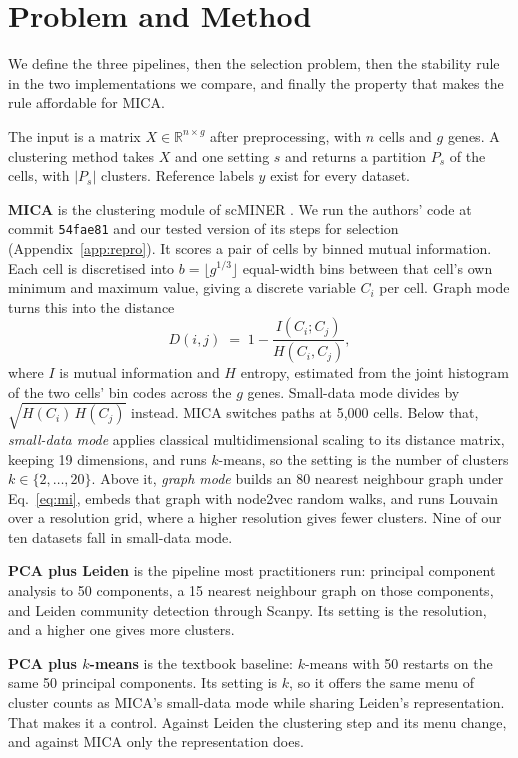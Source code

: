 \section{Problem and Method}\label{sec:method}
We define the three pipelines, then the selection problem, then the stability rule in the two
implementations we compare, and finally the property that makes the rule affordable for MICA.

The input is a matrix $X \in \mathbb{R}^{n \times g}$ after preprocessing, with $n$ cells and $g$
genes. A clustering method takes $X$ and one setting $s$ and returns a partition $P_s$ of the cells,
with $|P_s|$ clusters. Reference labels $y$ exist for every dataset.

\textbf{MICA} is the clustering module of scMINER \cite{pan2025scminer}. We run the authors' code at
commit \texttt{54fae81} and our tested version of its steps for selection (Appendix~\ref{app:repro}). It
scores a pair of cells by binned mutual information. Each cell is discretised into
$b = \lfloor g^{1/3} \rfloor$ equal-width bins between that cell's own minimum and maximum value, giving
a discrete variable $C_i$ per cell. Graph mode turns this into the distance
\begin{equation}
D(i,j) \;=\; 1 - \frac{I(C_i; C_j)}{H(C_i, C_j)},
\label{eq:mi}
\end{equation}
where $I$ is mutual information and $H$ entropy, estimated from the joint histogram of the two cells'
bin codes across the $g$ genes. Small-data mode divides by $\sqrt{H(C_i)\,H(C_j)}$ instead. MICA
switches paths at 5,000 cells. Below that, \emph{small-data mode} applies classical multidimensional
scaling to its distance matrix, keeping 19 dimensions, and runs $k$-means, so the setting is the number
of clusters $k \in \{2,\dots,20\}$. Above it, \emph{graph mode} builds an 80 nearest neighbour graph under
Eq.~\ref{eq:mi}, embeds that graph with node2vec random walks, and runs Louvain over a resolution grid,
where a higher resolution gives fewer clusters. Nine of our ten datasets fall in small-data mode.

\textbf{PCA plus Leiden} is the pipeline most practitioners run: principal component analysis to 50
components, a 15 nearest neighbour graph on those components, and Leiden community detection
\cite{traag2019louvain} through Scanpy. Its setting is the resolution, and a higher one gives more
clusters.

\textbf{PCA plus $k$-means} is the textbook baseline: $k$-means with 50 restarts on the same 50
principal components. Its setting is $k$, so it offers the same menu of cluster counts as MICA's
small-data mode while sharing Leiden's representation. That makes it a control. Against Leiden the clustering step and its menu change, and against MICA only the representation does.

